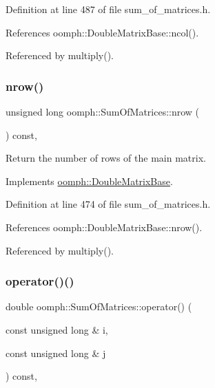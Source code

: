 Definition at line 487 of file sum\+\_\+of\+\_\+matrices.\+h.



References oomph\+::\+Double\+Matrix\+Base\+::ncol().



Referenced by multiply().

\mbox{\label{classoomph_1_1SumOfMatrices_a5d3b790f7e4f1bce927ecfb61844a52a}} 
\subsubsection{\texorpdfstring{nrow()}{nrow()}}
{\footnotesize\ttfamily unsigned long oomph\+::\+Sum\+Of\+Matrices\+::nrow (\begin{DoxyParamCaption}{ }\end{DoxyParamCaption}) const\hspace{0.3cm}{\ttfamily [inline]}, {\ttfamily [virtual]}}



Return the number of rows of the main matrix. 



Implements \hyperlink{classoomph_1_1DoubleMatrixBase_acdcd6e1ea2bf2380f1a2fa32c7829cb5}{oomph\+::\+Double\+Matrix\+Base}.



Definition at line 474 of file sum\+\_\+of\+\_\+matrices.\+h.



References oomph\+::\+Double\+Matrix\+Base\+::nrow().



Referenced by multiply().

\mbox{\label{classoomph_1_1SumOfMatrices_a934664ec676d36115ef27a9758827f7c}} 
\subsubsection{\texorpdfstring{operator()()}{operator()()}}
{\footnotesize\ttfamily double oomph\+::\+Sum\+Of\+Matrices\+::operator() (\begin{DoxyParamCaption}\item[{const unsigned long \&}]{i,  }\item[{const unsigned long \&}]{j }\end{DoxyParamCaption}) const\hspace{0.3cm}{\ttfamily [inline]}, {\ttfamily [virtual]}}

